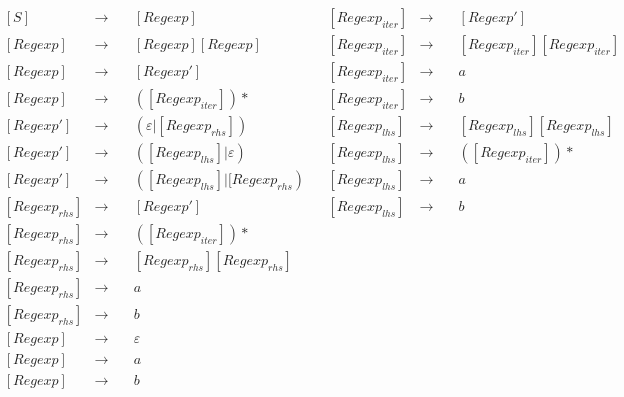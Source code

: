 \documentclass[a4paper, 14pt]{article}
\begin{document}
$$
\begin{aligned}
  &[S] &\rightarrow \quad &{[Regexp]} & &[Regexp_{iter}] &\rightarrow \quad  &[Regexp'] \\
  &[Regexp] &\rightarrow \quad &{[Regexp][Regexp]} & &[Regexp_{iter}] &\rightarrow \quad &[Regexp_{iter}][Regexp_{iter}] \\ 
  &[Regexp] &\rightarrow \quad &{[Regexp']} & &[Regexp_{iter}] &\rightarrow \quad &a \\
  &[Regexp] &\rightarrow \quad &{([Regexp_{iter}])*} & &[Regexp_{iter}] &\rightarrow \quad &b\\
  &[Regexp'] &\rightarrow \quad &{(\varepsilon|[Regexp_{rhs}])} & &[Regexp_{lhs}] &\rightarrow \quad &{[Regexp_{lhs}][Regexp_{lhs}]} \\
  &[Regexp'] &\rightarrow \quad &{([Regexp_{lhs}]|\varepsilon)} & &[Regexp_{lhs}] &\rightarrow \quad  &{([Regexp_{iter}])*} \\
  &[Regexp'] &\rightarrow \quad &{([Regexp_{lhs}]|[Regexp_{rhs})} & &[Regexp_{lhs}] &\rightarrow \quad  &a \\
  &[Regexp_{rhs}] &\rightarrow \quad &{[Regexp']} & &[Regexp_{lhs}] &\rightarrow \quad  &b \\ 
  &[Regexp_{rhs}] &\rightarrow \quad &{([Regexp_{iter}])*} \\ 
  &[Regexp_{rhs}] &\rightarrow \quad &{[Regexp_{rhs}][Regexp_{rhs}]} \\
  &[Regexp_{rhs}] &\rightarrow \quad &a \\
  &[Regexp_{rhs}] &\rightarrow \quad &b \\
  &[Regexp] &\rightarrow \quad &\varepsilon \\
  &[Regexp] &\rightarrow \quad &a \\
  &[Regexp] &\rightarrow \quad &b 
\end{aligned}
$$
\end{document}
